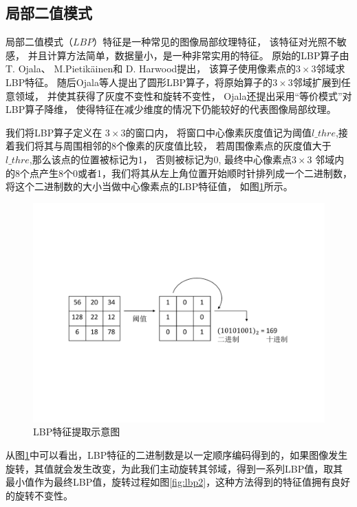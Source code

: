 \subsection{局部二值模式}

局部二值模式（$LBP$）特征是一种常见的图像局部纹理特征，
该特征对光照不敏感，
并且计算方法简单，数据量小，是一种非常实用的特征。
原始的LBP算子由T. Ojala、 M.Pietikäinen和 D. Harwood提出，
该算子使用像素点的$3\times 3$邻域求LBP特征。
随后Ojala等人提出了圆形LBP算子\cite{ojala2002multiresolution}，将原始算子的$3\times 3$邻域扩展到任意领域，
并使其获得了灰度不变性和旋转不变性，
Ojala还提出采用“等价模式”\cite{ojala2002multiresolution}对LBP算子降维，
使得特征在减少维度的情况下仍能较好的代表图像局部纹理。

我们将LBP算子定义在
$3\times 3$的窗口内，
将窗口中心像素灰度值记为阈值$l\_thre$,接着我们将其与周围相邻的8个像素的灰度值比较，
若周围像素点的灰度值大于$l\_thre$,那么该点的位置被标记为1，
否则被标记为0,
最终中心像素点$3\times 3$
邻域内的8个点产生8个0或者1，我们将其从左上角位置开始顺时针排列成一个二进制数，将这个二进制数的大小当做中心像素点的LBP特征值，
如图\ref{fig:lbp}所示。
\begin{figure}[htbp]
\centering
\includegraphics[width=1.0\linewidth]{figures/lbp.pdf}
\caption{LBP特征提取示意图}
\label{fig:lbp}
\end{figure}
从图\ref{fig:lbp}中可以看出，LBP特征的二进制数是以一定顺序编码得到的，如果图像发生旋转，其值就会发生改变，为此我们主动旋转其邻域，得到一系列LBP值，取其最小值作为最终LBP值，旋转过程如图\ref{fig:lbp2}，这种方法得到的特征值拥有良好的旋转不变性。
